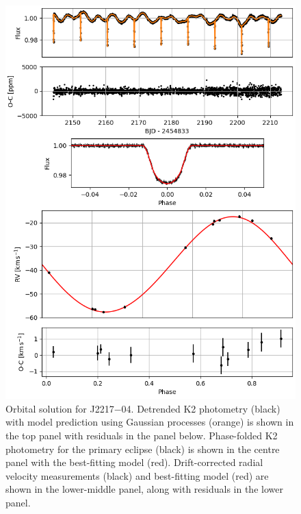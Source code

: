 \begin{figure}
    \centering
    \includegraphics[scale=0.8]{8-Results/J2217-04/orbital.png}
    \caption{ Orbital solution for J2217$-$04. Detrended K2 photometry (black) with model prediction using Gaussian processes (orange) is shown in the top panel with residuals in the panel below. Phase-folded K2 photometry for the primary eclipse (black) is shown in the centre panel with the best-fitting model (red). Drift-corrected radial velocity measurements (black) and best-fitting model (red) are shown in the lower-middle panel, along with residuals in the lower panel.  }
    \label{fig:J2217-04:orbital}
\end{figure}


